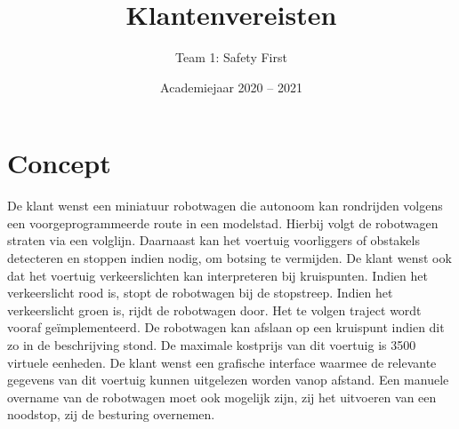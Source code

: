\documentclass[a4paper,kulak]{kulakarticle} %
\date{Academiejaar 2020 -- 2021}
\title{Klantenvereisten}
\author{Team 1: Safety First}
\begin{document}
\maketitle

\section{Concept}

De klant wenst een miniatuur robotwagen die autonoom kan rondrijden volgens een voorgeprogrammeerde route in een modelstad. Hierbij volgt de robotwagen straten via een volglijn. Daarnaast kan het voertuig voorliggers of obstakels detecteren en stoppen indien nodig, om botsing te vermijden. De klant wenst ook dat het voertuig verkeerslichten kan interpreteren bij kruispunten. Indien het verkeerslicht rood is, stopt de robotwagen bij de stopstreep. Indien het verkeerslicht groen is, rijdt de robotwagen door.  Het te volgen traject wordt vooraf geïmplementeerd. De robotwagen kan afslaan op een kruispunt indien dit zo in de beschrijving stond. De maximale kostprijs van dit voertuig is 3500 virtuele eenheden. De klant wenst een grafische interface waarmee de relevante gegevens van dit voertuig kunnen uitgelezen worden vanop afstand. Een manuele overname van de robotwagen moet ook mogelijk zijn, zij het uitvoeren van een noodstop, zij de besturing overnemen.
\end{document}
